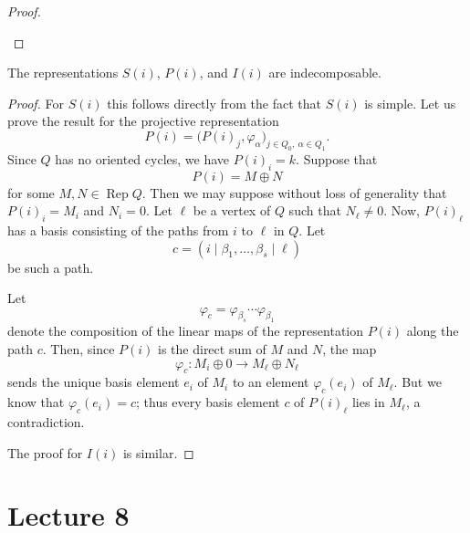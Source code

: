 \documentclass[11pt, a4paper]{report}
\begin{document}
\begin{proof}
\begin{center}
\end{center}
\end{proof}

\begin{proposition}
    The representations $S(i)$, $P(i)$, and $I(i)$ are indecomposable.
\end{proposition}

\begin{proof}
    For $S(i)$ this follows directly from the fact that $S(i)$ is simple. Let us prove
    the result for the projective representation
    \[
        P(i)=\bigl(P(i)_j,\varphi_\alpha\bigr)_{j\in Q_0,\ \alpha\in Q_1}.
    \]
    Since $Q$ has no oriented cycles, we have $P(i)_i=k$. Suppose that
    \[
        P(i)=M\oplus N
    \]
    for some $M,N\in \operatorname{Rep}Q$. Then we may suppose without loss of
    generality that $P(i)_i=M_i$ and $N_i=0$. Let $\ell$ be a vertex of $Q$ such that
    $N_\ell\neq 0$. Now, $P(i)_\ell$ has a basis consisting of the paths from $i$ to
    $\ell$ in $Q$. Let
    \[
        c=(i\mid \beta_1,\ldots,\beta_s\mid \ell)
    \]
    be such a path.

    Let
    \[
        \varphi_c=\varphi_{\beta_s}\cdots \varphi_{\beta_1}
    \]
    denote the composition of the linear maps of the representation $P(i)$ along the
    path $c$. Then, since $P(i)$ is the direct sum of $M$ and $N$, the map
    \[
        \varphi_c:M_i\oplus 0 \longrightarrow M_\ell\oplus N_\ell
    \]
    sends the unique basis element $e_i$ of $M_i$ to an element $\varphi_c(e_i)$ of
    $M_\ell$. But we know that $\varphi_c(e_i)=c$; thus every basis
    element $c$ of $P(i)_\ell$ lies in $M_\ell$, a contradiction.

    The proof for $I(i)$ is similar.
\end{proof}

\chapter{Lecture 8}
\end{document}
